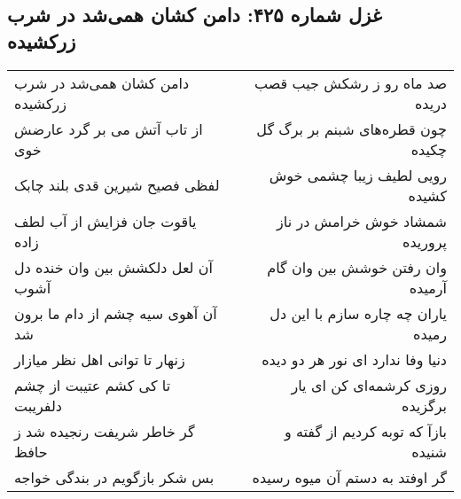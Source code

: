 \begin{center}
\section*{غزل شماره ۴۲۵: دامن کشان همی‌شد در شرب زرکشیده}
\label{sec:sh425}
\begin{longtable}{l p{0.5cm} r}
دامن کشان همی‌شد در شرب زرکشیده
&&
صد ماه رو ز رشکش جیب قصب دریده
\\
از تاب آتش می بر گرد عارضش خوی
&&
چون قطره‌های شبنم بر برگ گل چکیده
\\
لفظی فصیح شیرین قدی بلند چابک
&&
رویی لطیف زیبا چشمی خوش کشیده
\\
یاقوت جان فزایش از آب لطف زاده
&&
شمشاد خوش خرامش در ناز پروریده
\\
آن لعل دلکشش بین وان خنده دل آشوب
&&
وان رفتن خوشش بین وان گام آرمیده
\\
آن آهوی سیه چشم از دام ما برون شد
&&
یاران چه چاره سازم با این دل رمیده
\\
زنهار تا توانی اهل نظر میازار
&&
دنیا وفا ندارد ای نور هر دو دیده
\\
تا کی کشم عتیبت از چشم دلفریبت
&&
روزی کرشمه‌ای کن ای یار برگزیده
\\
گر خاطر شریفت رنجیده شد ز حافظ
&&
بازآ که توبه کردیم از گفته و شنیده
\\
بس شکر بازگویم در بندگی خواجه
&&
گر اوفتد به دستم آن میوه رسیده
\\
\end{longtable}
\end{center}
